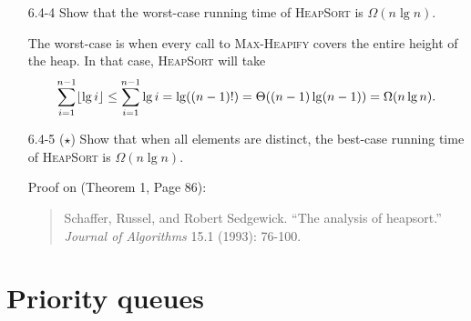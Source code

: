 \begin{enumerate}
\item[6.4-4]{Show that the worst-case running time of \textsc{HeapSort} is
$\Omega(n \lg n)$.}

\begin{framed}
The worst-case is when every call to \textsc{Max-Heapify} covers the entire
height of the heap. In that case, \textsc{HeapSort} will take
\[
  \sum_{i = 1}^{n - 1} \lfloor\lg i\rfloor \le \sum_{i = 1}^{n - 1} \lg i = \lg((n - 1)!) = \Theta((n - 1) \lg (n - 1)) = \Omega(n \lg n).
\]
\end{framed}

\item[6.4-5]{($\star$) Show that when all elements are distinct, the best-case
running time of \textsc{HeapSort} is $\Omega(n \lg n)$.}

\begin{framed}
Proof on (Theorem 1, Page 86):
\begin{quote}
Schaffer, Russel, and Robert Sedgewick. ``The analysis of heapsort.''
\emph{Journal of Algorithms} 15.1 (1993): 76-100.
\end{quote}
\end{framed}

\end{enumerate}

\newpage

\section{Priority queues}

